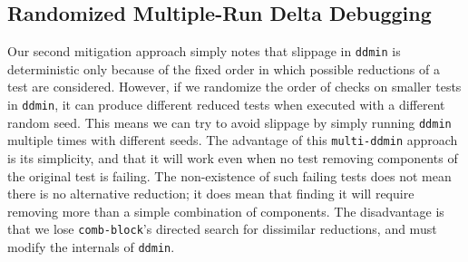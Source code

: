 \begin{algorithm}
\caption{}
\label{comb-block}
\begin{algorithmic}[1]
\EndIf
{}
\Else
{}
\EndIf
\EndIf
\EndFor
\EndFor
{}
\EndWhile
{}
\end{algorithmic}
\end{algorithm}

\subsection{Randomized Multiple-Run Delta Debugging}

Our second mitigation approach simply notes that slippage in {\tt ddmin} is
deterministic only because of the fixed order in which possible
reductions of a test  are considered.  However, if we randomize
the order of checks on smaller tests in {\tt ddmin}, it can produce different
reduced tests when executed with a different random seed.  This means
we can try to avoid slippage by simply running {\tt ddmin} multiple
times with different seeds.  The advantage of this {\tt multi-ddmin} approach is its
simplicity, and that it will work even when no test removing
components of the original test is failing.  The non-existence of such
failing tests does not mean
there is no alternative reduction; it does mean that finding it will
require removing more than a simple combination of components.
The disadvantage is that we lose {\tt comb-block}'s directed search
for dissimilar reductions, and must modify the internals of {\tt ddmin}.
